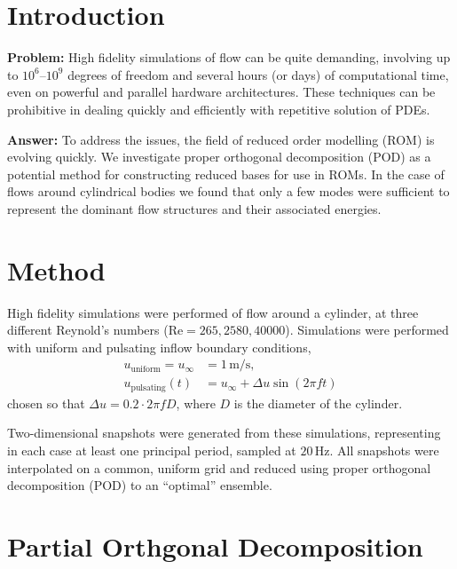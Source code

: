 \documentclass[a0,portrait]{a0poster}
\begin{document}
\begin{multicols}{2}

\color{DarkSlateGray}
\Large

\section*{\LARGE Introduction}

\textbf{Problem:} High fidelity simulations of flow can be quite demanding,
involving up to $10^6$--$10^9$ degrees of freedom and several hours (or days) of
computational time, even on powerful and parallel hardware architectures. These
techniques can be prohibitive in dealing quickly and efficiently with repetitive
solution of PDEs.

\textbf{Answer:} To address the issues, the field of reduced order modelling
(ROM) is evolving quickly. We investigate proper orthogonal decomposition (POD)
as a potential method for constructing reduced bases for use in ROMs. In the
case of flows around cylindrical bodies we found that only a few modes were
sufficient to represent the dominant flow structures and their associated
energies.

\section*{\LARGE Method}

High fidelity simulations were performed of flow around a cylinder, at three
different Reynold's numbers ($\text{Re} = 265, 2580, 40000$). Simulations were
performed with uniform and pulsating inflow boundary conditions,
\begin{align*}
  u_\text{uniform} = u_\infty &= 1\,\text{m}/\text{s}, \\
  u_\text{pulsating}(t) &= u_\infty + \Delta u \sin\left( 2\pi f t \right)
\end{align*}
chosen so that $\Delta u = 0.2 \cdot 2\pi f D$, where $D$ is the
diameter of the cylinder.

Two-dimensional snapshots were generated from these simulations, representing in
each case at least one principal period, sampled at $20 \, \text{Hz}$. All
snapshots were interpolated on a common, uniform grid and reduced using proper
orthogonal decomposition (POD) to an ``optimal'' ensemble.

\section*{\LARGE Partial Orthgonal Decomposition} \Large


\end{multicols}
\end{document}
